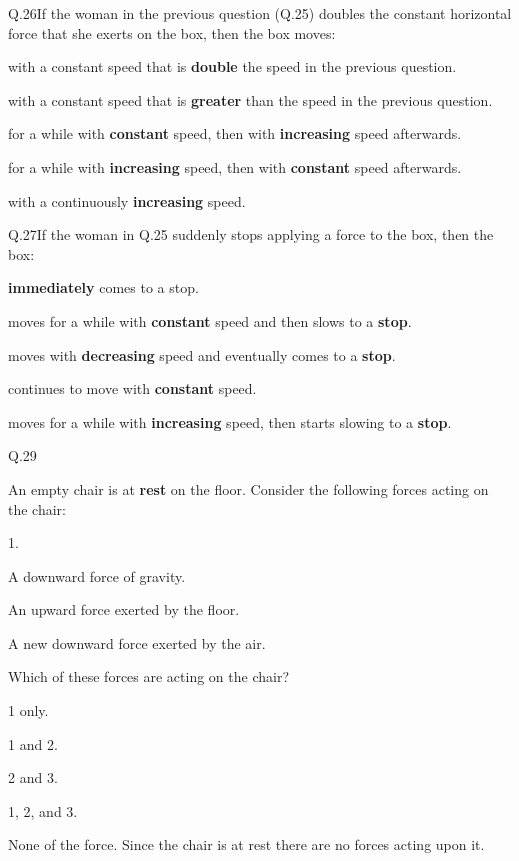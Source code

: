     \begin{mcq}{Q.26}{If the woman in the previous question (Q.25) doubles the constant horizontal force that she exerts on the box, then the box moves:}
        \item with a constant speed that is \textbf{double} the speed in the previous question.
        \item with a constant speed that is \textbf{greater} than the speed in the previous question.
        \item for a while with \textbf{constant} speed, then with \textbf{increasing} speed afterwards.
        \item for a while with \textbf{increasing} speed, then with \textbf{constant} speed afterwards.
        \item with a continuously \textbf{increasing} speed.
    \end{mcq}

    \begin{mcq}{Q.27}{If the woman in Q.25 suddenly stops applying a force to the box, then the box:}
        \item \textbf{immediately} comes to a stop.
        \item moves for a while with \textbf{constant} speed and then slows to a \textbf{stop}.
        \item moves with \textbf{decreasing} speed and eventually comes to a \textbf{stop}.
        \item continues to move with \textbf{constant} speed.
        \item moves for a while with \textbf{increasing} speed, then starts slowing to a \textbf{stop}.
    \end{mcq}

    \begin{mcq}{Q.29}{An empty chair is at \textbf{rest} on the floor. Consider the following forces acting on the chair:

        \eline[]
        \begin{options}{1.}
            \item A downward force of gravity.
            \item An upward force exerted by the floor.
            \item A new downward force exerted by the air.
        \end{options}
        \eline[]

        Which of these forces are acting on the chair?
    }
        \item 1 only.
        \item 1 and 2.
        \item 2 and 3.
        \item 1, 2, and 3.
        \item None of the force. Since the chair is at rest there are no forces acting upon it.
    \end{mcq}


